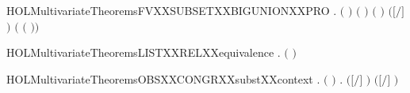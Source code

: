 \newcommand{\HOLMultivariateTheoremsFVXXSUBSETXXBIGUNION}{\UseVerbatim{HOLMultivariateTheoremsFVXXSUBSETXXBIGUNION}}
\begin{SaveVerbatim}{HOLMultivariateTheoremsFVXXSUBSETXXBIGUNIONXXPRO}
\HOLTokenTurnstile{} \HOLSymConst{\HOLTokenForall{}}  .
         \HOLSymConst{\HOLTokenConj{}} \ensuremath{(}  \HOLSymConst{\ensuremath{=}}  \ensuremath{)} \HOLSymConst{\HOLTokenConj{}}
        \ensuremath{(} \ensuremath{)} \ensuremath{(} \ensuremath{)} \HOLSymConst{\HOLTokenImp{}}
        \ensuremath{(}\ensuremath{[}\ensuremath{/}\ensuremath{]} \ensuremath{)} \HOLConst{\HOLTokenSubset{}}
            \HOLConst{\HOLTokenUnion{}}  \ensuremath{(}  \ensuremath{(} \ensuremath{)}\ensuremath{)}
\end{SaveVerbatim}
\newcommand{\HOLMultivariateTheoremsFVXXSUBSETXXBIGUNIONXXPRO}{\UseVerbatim{HOLMultivariateTheoremsFVXXSUBSETXXBIGUNIONXXPRO}}
\begin{SaveVerbatim}{HOLMultivariateTheoremsLISTXXRELXXequivalence}
\HOLTokenTurnstile{} \HOLSymConst{\HOLTokenForall{}}.   \HOLSymConst{\HOLTokenImp{}}  \ensuremath{(} \ensuremath{)}
\end{SaveVerbatim}
\newcommand{\HOLMultivariateTheoremsLISTXXRELXXequivalence}{\UseVerbatim{HOLMultivariateTheoremsLISTXXRELXXequivalence}}
\begin{SaveVerbatim}{HOLMultivariateTheoremsOBSXXCONGRXXsubstXXcontext}
\HOLTokenTurnstile{} \HOLSymConst{\HOLTokenForall{}}  .
         \HOLSymConst{\HOLTokenConj{}} \ensuremath{(}  \HOLSymConst{\ensuremath{=}}  \ensuremath{)} \HOLSymConst{\HOLTokenConj{}}
          \HOLSymConst{\HOLTokenImp{}}
       \HOLSymConst{\HOLTokenForall{}}.    \HOLSymConst{\HOLTokenImp{}}  \ensuremath{(}\ensuremath{[}\ensuremath{/}\ensuremath{]} \ensuremath{)} \ensuremath{(}\ensuremath{[}\ensuremath{/}\ensuremath{]} \ensuremath{)}
\end{SaveVerbatim}
